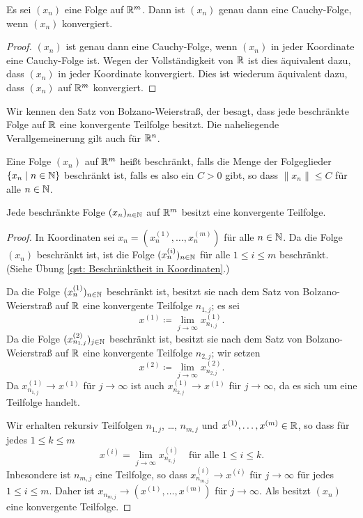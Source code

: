 \documentclass[a4paper,10pt]{article}
\begin{document}
\begin{prop}
 Es sei $(x_n)$ eine Folge auf $\mathbb{R}^m$. Dann ist $(x_n)$ genau dann eine Cauchy-Folge, wenn $(x_n)$ konvergiert.
\end{prop}
\begin{proof}
 $(x_n)$ ist genau dann eine Cauchy-Folge, wenn $(x_n)$ in jeder Koordinate eine Cauchy-Folge ist. Wegen der Vollständigkeit von $\mathbb{R}$ ist dies äquivalent dazu, dass $(x_n)$ in jeder Koordinate konvergiert. Dies ist wiederum äquivalent dazu, dass $(x_n)$ auf $\mathbb{R}^m$ konvergiert.
\end{proof}


Wir kennen den Satz von Bolzano-Weierstraß, der besagt, dass jede beschränkte Folge auf $\mathbb{R}$ eine konvergente Teilfolge besitzt. Die naheliegende Verallgemeinerung gilt auch für $\mathbb{R}^n$.


\begin{defi}
 Eine Folge $(x_n)$ auf $\mathbb{R}^m$ heißt beschränkt, falls die Menge der Folgeglieder $\{x_n \mid n \in \mathbb{N}\}$ beschränkt ist, falls es also ein $C > 0$ gibt, so dass $\|x_n\| \leq C$ für alle $n \in \mathbb{N}$.
\end{defi}


\begin{prop}
 Jede beschränkte Folge $(x_n)_{n \in \mathbb{N}}$ auf $\mathbb{R}^m$ besitzt eine konvergente Teilfolge.
\end{prop}
\begin{proof}
 In Koordinaten sei $x_n = (x^{(1)}_n, \dotsc, x^{(m)}_n)$ für alle $n \in \mathbb{N}$. Da die Folge $(x_n)$ beschränkt ist, ist die Folge $(x^{(i)}_n)_{n \in \mathbb{N}}$ für alle $1 \leq i \leq m$ beschränkt. (Siehe Übung \ref{qst: Beschränktheit in Koordinaten}.)
 
 Da die Folge $(x^{(1)}_n)_{n \in \mathbb{N}}$ beschränkt ist, besitzt sie nach dem Satz von Bolzano-Weierstraß auf $\mathbb{R}$ eine konvergente Teilfolge $n_{1,j}$; es sei
 \[
  x^{(1)} \coloneqq \lim_{j \to \infty} x^{(1)}_{n_{1,j}}.
 \]
 Da die Folge $(x^{(2)}_{n_{1,j}})_{j \in \mathbb{N}}$ beschränkt ist, besitzt sie nach dem Satz von Bolzano-Weierstraß auf $\mathbb{R}$ eine konvergente Teilfolge $n_{2,j}$; wir setzen
 \[
  x^{(2)} \coloneqq \lim_{j \to \infty} x^{(2)}_{n_{2,j}}.
 \]
 Da $x^{(1)}_{n_{1,j}} \to x^{(1)}$ für $j \to \infty$ ist auch $x^{(1)}_{n_{2,j}} \to x^{(1)}$ für $j \to \infty$, da es sich um eine Teilfolge handelt.
 
 Wir erhalten rekursiv Teilfolgen $n_{1,j}$, \dots, $n_{m,j}$ und $x^{(1)}, \dotsc, x^{(m)} \in \mathbb{R}$, so dass für jedes $1 \leq k \leq m$
 \[
  x^{(i)} = \lim_{j \to \infty} x^{(i)}_{n_{k,j}} \quad \text{für alle $1 \leq i \leq k$}.
 \]
 Inbesondere ist $n_{m,j}$ eine Teilfolge, so dass $x^{(i)}_{n_{m,j}} \to x^{(i)}$ für $j \to \infty$ für jedes $1 \leq i \leq m$. Daher ist $x_{n_{m,j}} \to (x^{(1)}, \dotsc, x^{(m)})$ für $j \to \infty$. Als besitzt $(x_n)$ eine konvergente Teilfolge.
\end{proof}
\end{document}
